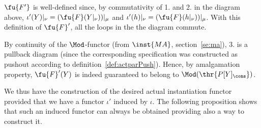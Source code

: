 $\fu{F'}$ is well-defined since, by commutativity of 1. and 2. in the diagram
above, $\iota'(Y)|_{\nu} =
(\fu{F}(Y|_\nu))|_{\mu}$ and $\iota'(h)|_{\nu} = (\fu{F}(h|_\nu))|_{\mu}$.
With this definition of $\fu{F}'$, all the loops
in the the diagram commute. 
%

By continuity of the $\Mod$-functor (from $\inst{MA}$, section~\ref{se:ma}), 3. is a pullback
diagram (since the corresponding specification was constructed as pushout
according to definition~\ref{def:actparPush}). Hence, by amalgamation
property, $\fu{F}'(Y)$ is indeed guaranteed to belong to
$\Mod(\thr{P[Y]_\cons})$. 

We thus have the construction of the desired actual instantiation functor provided
that we have a functor $\iota'$ induced by $\iota$. The following proposition
shows that such an induced functor can always be obtained providing also a
way to construct it.

